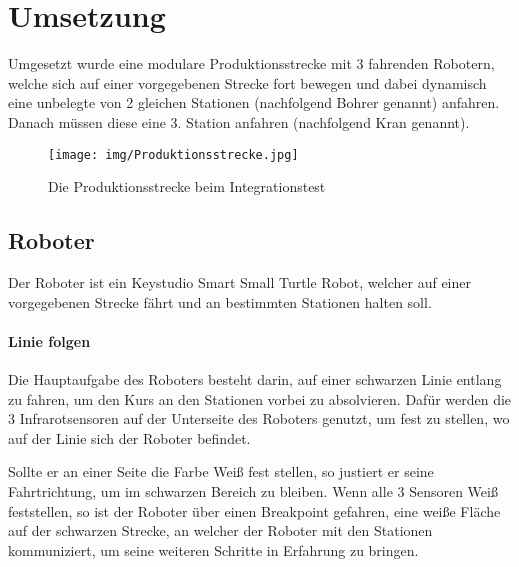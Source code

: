 \chapter{Umsetzung}
Umgesetzt wurde eine modulare Produktionsstrecke mit 3 fahrenden Robotern, welche sich auf einer vorgegebenen Strecke fort bewegen und dabei dynamisch eine unbelegte von 2 gleichen Stationen (nachfolgend Bohrer genannt) anfahren. Danach müssen diese eine 3. Station anfahren (nachfolgend Kran genannt).
\begin{figure}[h]
\begin{center}
\texttt{[image: img/Produktionsstrecke.jpg]}
\caption{Die Produktionsstrecke beim Integrationstest}
\end{center}
\end{figure}

\section{Roboter}
Der Roboter ist ein Keystudio Smart Small Turtle Robot, welcher auf einer vorgegebenen Strecke fährt und an bestimmten Stationen halten soll.
\subsubsection{Linie folgen}
Die Hauptaufgabe des Roboters besteht darin, auf einer schwarzen Linie entlang zu fahren, um den Kurs an den Stationen vorbei zu absolvieren. Dafür werden die 3 Infrarotsensoren auf der Unterseite des Roboters genutzt, um fest zu stellen, wo auf der Linie sich der Roboter befindet.

Sollte er an einer Seite die Farbe Weiß fest stellen, so justiert er seine Fahrtrichtung, um im schwarzen Bereich zu bleiben. Wenn alle 3 Sensoren Weiß feststellen, so ist der Roboter über einen Breakpoint gefahren, eine weiße Fläche auf der schwarzen Strecke, an welcher der Roboter mit den Stationen kommuniziert, um seine weiteren Schritte in Erfahrung zu bringen.

